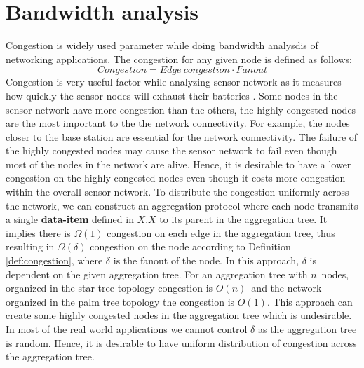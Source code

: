 \section{Bandwidth analysis}
	Congestion is widely used parameter while doing bandwidth analysdis of networking applications. 
	The congestion for any given node is defined as follows:
	\begin{equation}\label{def:congestion}
		Congestion = Edge\ congestion \cdot Fanout
	\end{equation}
	Congestion is very useful factor while analyzing sensor network as it measures how quickly the sensor nodes will exhaust their batteries \cite{madden2003design}. 
	Some nodes in the sensor network have more congestion than the others, the highly congested nodes are the most important to the the network connectivity.
	For example, the nodes closer to the base station are essential for the network connectivity.
	The failure of the highly congested nodes may cause the sensor network to fail even though most of the nodes in the network are alive.
	Hence, it is desirable to have a lower congestion on the highly congested nodes even though it costs more congestion within the overall sensor network.
	To distribute the congestion uniformly across the network, we can construct an aggregation protocol where each node transmits a single \textbf{data-item} defined in $X.X$ to its parent in the aggregation tree.
	It implies there is $\Omega(1)$ congestion on each edge in the aggregation tree, thus resulting in $\Omega(\delta)$ congestion on the node  according to Definition \ref{def:congestion}, where $\delta$ is the fanout of the node.
	In this approach, $\delta$ is dependent on the given aggregation tree.
	For an aggregation tree with $n$\ nodes, organized in the star tree topology congestion is $O(n)$\ and the network organized in the palm tree topology the congestion is $O(1)$.
	This approach can create some highly congested nodes in the aggregation tree which is undesirable.
	In most of the real world applications we cannot control $\delta$ as the aggregation tree is random.
	Hence, it is desirable to have uniform distribution of congestion across the aggregation tree.



